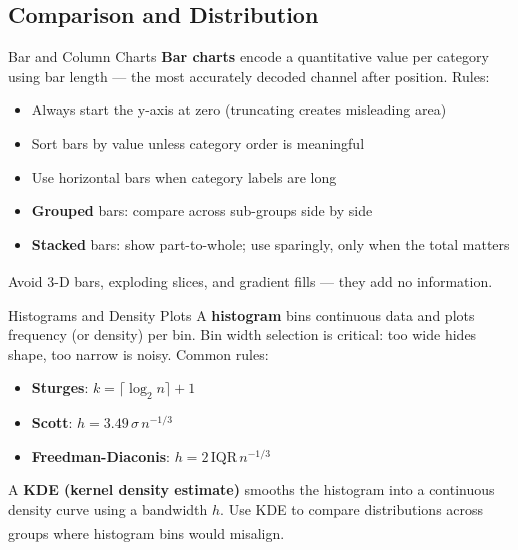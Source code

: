 \subsection{Comparison and Distribution}

\begin{v3topic}{Bar and Column Charts}
    \textbf{Bar charts} encode a quantitative value per category using bar length ---
    the most accurately decoded channel after position. Rules:
    \begin{itemize}
        \item Always start the y-axis at zero (truncating creates misleading area)
        \item Sort bars by value unless category order is meaningful
        \item Use horizontal bars when category labels are long
        \item \textbf{Grouped} bars: compare across sub-groups side by side
        \item \textbf{Stacked} bars: show part-to-whole; use sparingly, only when
              the total matters
    \end{itemize}
    Avoid 3-D bars, exploding slices, and gradient fills --- they add no
    information\textsuperscript{\cite[][pp.~60--75]{brucePracticalStatisticsData2017}}.

\end{v3topic}
\begin{v3topic}{Histograms and Density Plots}
    A \textbf{histogram} bins continuous data and plots frequency (or density) per bin.
    Bin width selection is critical: too wide hides shape, too narrow is noisy.
    Common rules:
    \begin{itemize}
        \item \textbf{Sturges}: $k = \lceil \log_2 n \rceil + 1$
        \item \textbf{Scott}: $h = 3.49\,\hat{\sigma}\,n^{-1/3}$
        \item \textbf{Freedman-Diaconis}: $h = 2\,\text{IQR}\,n^{-1/3}$
    \end{itemize}
    A \textbf{KDE (kernel density estimate)} smooths the histogram into a continuous
    density curve using a bandwidth $h$. Use KDE to compare distributions across
    groups where histogram bins would
    misalign\textsuperscript{\cite[][pp.~45--50]{downeyThinkStatsExploratory2015}}.

\end{v3topic}
